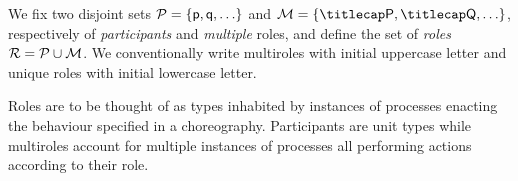 %

We fix two disjoint sets $\participants = \{\ptp p, \ptp q, \ldots\}$
and $\multiroles = \{\amulti P, \amulti Q, \ldots \}$, respectively of
\emph{participants} and \emph{multiple} roles, and define the set of
\emph{roles} $\mathcal{R} = \mathcal{P} \cup \mathcal{M}$.
%
We conventionally write multiroles with initial uppercase letter and
unique roles with initial lowercase letter.
%

Roles are to be thought of as types inhabited by instances of
processes enacting the behaviour specified in a choreography.
%
Participants are unit types while multiroles account for multiple
instances of processes all performing actions according to their role.
%

